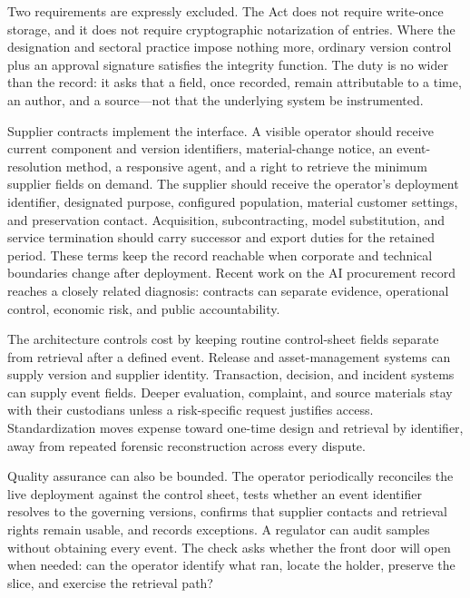 Two requirements are expressly excluded. The Act does not require write-once storage, and it does not require cryptographic notarization of entries. Where the designation and sectoral practice impose nothing more, ordinary version control plus an approval signature satisfies the integrity function. The duty is no wider than the record: it asks that a field, once recorded, remain attributable to a time, an author, and a source---not that the underlying system be instrumented.

Supplier contracts implement the interface. A visible operator should receive current component and version identifiers, material-change notice, an event-resolution method, a responsive agent, and a right to retrieve the minimum supplier fields on demand. The supplier should receive the operator's deployment identifier, designated purpose, configured population, material customer settings, and preservation contact. Acquisition, subcontracting, model substitution, and service termination should carry successor and export duties for the retained period. These terms keep the record reachable when corporate and technical boundaries change after deployment. Recent work on the AI procurement record reaches a closely related diagnosis: contracts can separate evidence, operational control, economic risk, and public accountability.

The architecture controls cost by keeping routine control-sheet fields separate from retrieval after a defined event. Release and asset-management systems can supply version and supplier identity. Transaction, decision, and incident systems can supply event fields. Deeper evaluation, complaint, and source materials stay with their custodians unless a risk-specific request justifies access. Standardization moves expense toward one-time design and retrieval by identifier, away from repeated forensic reconstruction across every dispute.

Quality assurance can also be bounded. The operator periodically reconciles the live deployment against the control sheet, tests whether an event identifier resolves to the governing versions, confirms that supplier contacts and retrieval rights remain usable, and records exceptions. A regulator can audit samples without obtaining every event. The check asks whether the front door will open when needed: can the operator identify what ran, locate the holder, preserve the slice, and exercise the retrieval path?

